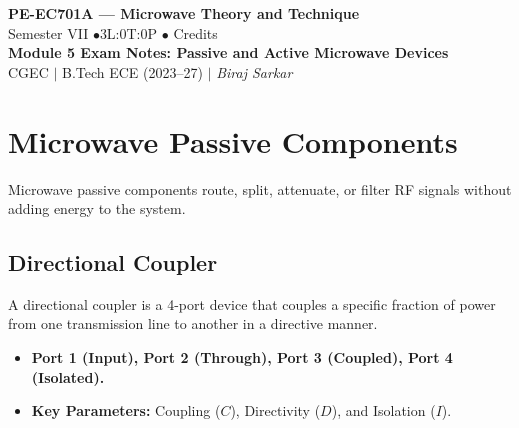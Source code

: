 \documentclass[12pt,a4paper]{article}
\begin{document}

\begin{center}
  {\LARGE\bfseries\color{myred} PE-EC701A --- Microwave Theory and Technique}\\[5pt]
  {\normalsize\color{mydark} Semester VII \quad$\bullet$\quad 3L:0T:0P \quad$\bullet$ Credits}\\[3pt]
  {\normalsize\color{myteal}\textbf{Module 5 Exam Notes: Passive and Active Microwave Devices}}\\[3pt]
  {\small\color{mydark} CGEC \;$|$\; B.Tech ECE (2023--27) \;$|$\; \textit{Biraj Sarkar}}
\end{center}
\vspace{2pt}
\noindent{\color{myred}\rule{\linewidth}{1.5pt}}
\vspace{2pt}

\hypersetup{linkcolor=mydark}
\tableofcontents
\hypersetup{linkcolor=myteal}
\newpage

\section{Microwave Passive Components}

Microwave passive components route, split, attenuate, or filter RF signals without adding energy to the system.

\subsection{Directional Coupler}
A directional coupler is a 4-port device that couples a specific fraction of power from one transmission line to another in a directive manner.
\begin{itemize}[leftmargin=*, itemsep=3pt]
  \item \textbf{Port 1 (Input), Port 2 (Through), Port 3 (Coupled), Port 4 (Isolated).}
  \item \textbf{Key Parameters:} Coupling ($C$), Directivity ($D$), and Isolation ($I$).
\end{itemize}
\end{document}
